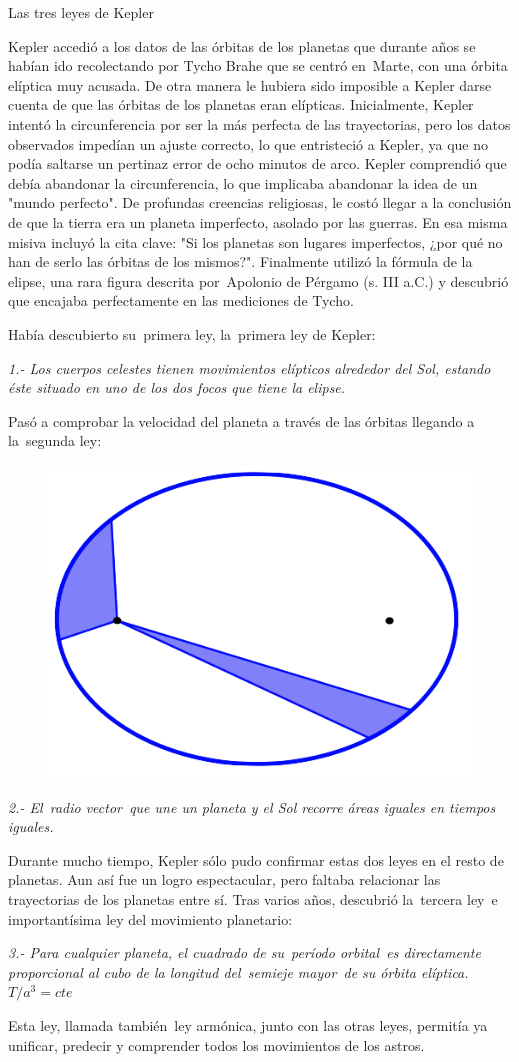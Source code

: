 \begin{miparrafo}
Las tres leyes de Kepler

Kepler accedió a los datos de las órbitas de los planetas que durante años se habían ido recolectando por Tycho Brahe que se centró en Marte, con una órbita elíptica muy acusada. De otra manera le hubiera sido imposible a Kepler darse cuenta de que las órbitas de los planetas eran elípticas. Inicialmente, Kepler intentó la circunferencia por ser la más perfecta de las trayectorias, pero los datos observados impedían un ajuste correcto, lo que entristeció a Kepler, ya que no podía saltarse un pertinaz error de ocho minutos de arco. Kepler comprendió que debía abandonar la circunferencia, lo que implicaba abandonar la idea de un "mundo perfecto". De profundas creencias religiosas, le costó llegar a la conclusión de que la tierra era un planeta imperfecto, asolado por las guerras. En esa misma misiva incluyó la cita clave: "Si los planetas son lugares imperfectos, ¿por qué no han de serlo las órbitas de los mismos?". Finalmente utilizó la fórmula de la elipse, una rara figura descrita por Apolonio de Pérgamo (s. III a.C.)  y descubrió que encajaba perfectamente en las mediciones de Tycho.

Había descubierto su primera ley, la primera ley de Kepler:

\emph{1.- Los cuerpos celestes tienen movimientos elípticos alrededor del Sol, estando éste situado en uno de los dos focos que tiene la elipse.}

Pasó a comprobar la velocidad del planeta a través de las órbitas llegando a la segunda ley:
\begin{multicols}{2}
\begin{figure}[H]
	\centering
	\includegraphics[width=.35\textwidth]{imagenes/imagenes14/T14IM02.png}
\end{figure}
\emph{2.-  El radio vector que une un planeta y el Sol recorre áreas iguales en tiempos iguales.}

Durante mucho tiempo, Kepler sólo pudo confirmar estas dos leyes en el resto de planetas. Aun así fue un logro espectacular, pero faltaba relacionar las trayectorias de los planetas entre sí. Tras varios años, descubrió la tercera ley e importantísima ley del movimiento planetario:
\end{multicols}
\emph{3.-  Para cualquier planeta, el cuadrado de su período orbital es directamente proporcional al cubo de la longitud del semieje mayor de su órbita elíptica. $T/a^3=cte$}

Esta ley, llamada también ley armónica, junto con las otras leyes, permitía ya unificar, predecir y comprender todos los movimientos de los astros.
\end{miparrafo}

